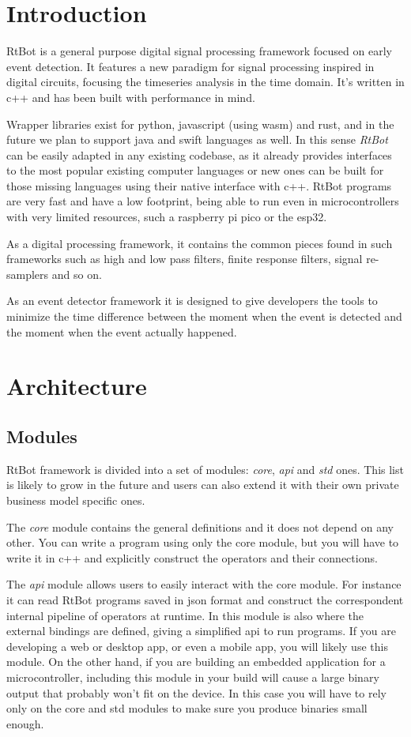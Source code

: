\documentclass[preprint,1p,times]{elsarticle}
\begin{document}

\section{Introduction}
\label{}
RtBot is a general purpose digital signal processing framework focused on early event detection. 
It features a new paradigm for signal processing inspired in digital circuits, focusing the timeseries
analysis in the time domain.
It’s written in c++ and has been built with performance in mind.

Wrapper libraries exist for python, javascript (using wasm) and rust, and in the future we plan 
to support java and swift languages as well. In this sense \emph{RtBot} can be easily adapted in any 
existing codebase, as it already provides interfaces to the most popular existing computer 
languages or new ones can be built for those missing languages using their native interface 
with c++. RtBot programs are very fast and have a low footprint, being able to run even in 
microcontrollers with very limited resources, such a raspberry pi pico or the esp32.

As a digital processing framework, it contains the common pieces found in such frameworks such as 
high and low pass filters, finite response filters, signal re-samplers and so on. 

As an event detector framework it is designed to give developers the tools to minimize the time 
difference between the moment when the event is detected and the moment when the event actually 
happened.


\section{Architecture}
\subsection{Modules}
RtBot framework is divided into a set of modules: \textit{core}, \textit{api} and \textit{std} ones. This 
list is likely to grow in the future and users can also extend it with their own 
private business model specific ones.


The \textit{core} module contains the general definitions and it does not depend on any 
other. You can write a program using only the core module, but you will have to 
write it in c++ and explicitly construct the operators and their connections. 


The \textit{api} module allows users to easily interact with the core module. For instance 
it can read RtBot programs saved in json format and construct the correspondent 
internal pipeline of operators at runtime. In this module is also where the 
external bindings are defined, giving a simplified api to run programs. If you are 
developing a web or desktop app, or even a mobile app, you will likely use this 
module. On the other hand, if you are building an embedded application for a 
microcontroller, including this module in your build will cause a large binary 
output that probably won’t fit on the device. In this case you will have to rely 
only on the core and std modules to make sure you produce binaries small enough.
\end{document}
